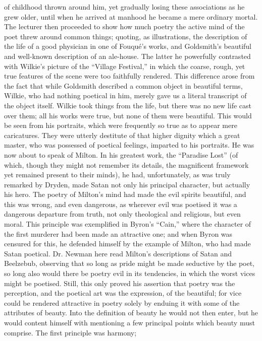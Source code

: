 of childhood thrown around him, yet gradually losing these
associations as he grew older, until when he arrived at manhood he
became a mere ordinary mortal. The lecturer then proceeded to show how
much poetry the active mind of the poet threw around common things;
quoting, as illustrations, the description of the life of a good
physician in one of Fouqué's works, and Goldsmith's beautiful and
well-known description of an ale-house. The latter he powerfully
contrasted with Wilkie's picture of the ``Village Festival,'' in which
the coarse, rough, yet true features of the scene were too faithfully
rendered. This difference arose from the fact that while Goldsmith
described a common object in beautiful terms, Wilkie, who had nothing
poetical in him, merely gave us a literal transcript of the object
itself. Wilkie took things from the life, but there was no new life
cast over them; all his works were true, but none of them were
beautiful. This would be seen from his portraits, which were
frequently so true as to appear mere caricatures. They were utterly
destitute of that higher dignity which a great master, who was
possessed of poetical feelings, imparted to his portraits. He was now
about to speak of Milton. In his greatest work, the ``Paradise Lost''
(of which, though they might not remember its details, the magnificent
framework yet remained present to their minds), he had, unfortunately,
as was truly remarked by Dryden, made Satan not only his principal
character, but actually his hero. The poetry of Milton's mind had made
the evil spirits beautiful, and this was wrong, and even dangerous, as
wherever evil was poetised it was a dangerous departure from truth,
not only theological and religious, but even moral. This principle was
exemplified in Byron's ``Cain,'' where the character of the first murderer had been made an attractive one; and when Byron was censured
for this, he defended himself by the example of Milton, who had made
Satan poetical. Dr. Newman here read Milton's descriptions of Satan
and Beelzebub, observing that so long as pride might be made seductive
by the poet, so long also would there be poetry evil in its
tendencies, in which the worst vices might be poetised. Still, this
only proved his assertion that poetry was the perception, and the
poetical art was the expression, of the beautiful; for vice could be
rendered attractive in poetry solely by enduing it with some of the
attributes of beauty. Into the definition of beauty he would not then
enter, but he would content himself with mentioning a few principal
points which beauty must comprise. The first principle was harmony;
